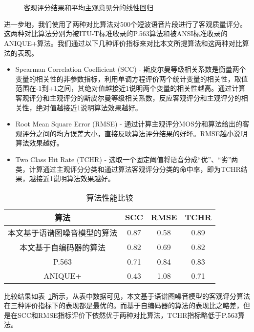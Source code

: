 \begin{figure}
\centering
{}
\vspace{0.6ex}
\\
\vspace{0.8ex}
\\
\caption{客观评分结果和平均主观意见分的线性回归\label{fig:regress}}
\end{figure}

进一步地，我们使用了两种对比算法对500个短波语音片段进行了客观质量评分。这两种对比算法分别为被ITU-T标准收录的P.563算法和被ANSI标准收录的ANIQUE+算法。我们通过以下几种评价指标来对比本文所提算法和这两种对比算法的表现。

\begin{itemize}
\item Spearman Correlation Coefficient (SCC) - 斯皮尔曼等级相关系数是衡量两个变量的相关性的非参数指标，利用单调方程评价两个统计变量的相关性，取值范围在-1到+1之间，其绝对值越接近1说明两个变量的相关性越高。通过计算客观评分和主观评分的斯皮尔曼等级相关系数，反应客观评分和主观评分的相关性，绝对值越接近1说明算法效果越好。
\item Root Mean Square Error (RMSE) - 通过计算主观评分MOS分和算法给出的客观评分之间的均方误差大小，直接反映算法评分结果的好坏。RMSE越小说明算法效果越好。
\item Two Class Hit Rate (TCHR) - 选取一个固定阈值将语音分成“优”、“劣”两类，计算通过主观评分分类和通过算法客观评分分类的命中率，即为TCHR结果，越接近1说明算法效果越好。
\end{itemize}

\begin{table}
\centering
\caption{算法性能比较}
\label{tab:alg-compare}
\begin{tabular}{cccc}
\toprule[1.5pt]
算法 & SCC & RMSE & TCHR \\ \midrule[1pt]
本文基于语谱图噪音模型的算法 & 0.87 & 0.58 & 0.89 \\
本文基于自编码器的算法 & 0.82 & 0.69 & 0.82 \\
P.563 & 0.71 & 0.84 & 0.83 \\
ANIQUE+ & 0.43 & 1.08 & 0.71 \\
\end{tabular}
\end{table}

比较结果如表~\ref{tab:alg-compare}所示，从表中数据可见，本文基于语谱图噪音模型的客观评分算法在三种评价指标下的表现都是最优的。而基于自编码器的算法的表现比之略差，但是在SCC和RMSE指标评价下依然优于两种对比算法，TCHR指标略低于P.563算法。

